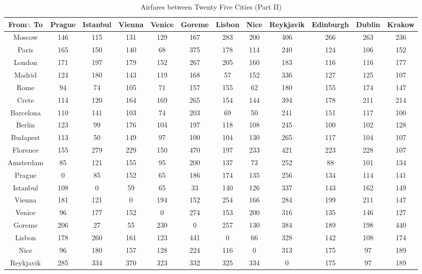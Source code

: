 \documentclass[12pt]{article}
\begin{document}
\begin{landscape}
\begin{table}[h]
\caption{Airfares between Twenty Five Cities (Part II)}
\centering
\vspace{1mm}
\begin{tabular}{c|c|c|c|c|c|c|c|c|c|c|c}
\hline
\rule{0pt}{2ex} From$\backslash$ To & Prague & Istanbul & Vienna & Venice & Goreme & Lisbon & Nice & Reykjavik & Edinburgh & Dublin & Krakow  \\
\hline
\rule{0pt}{2ex}Moscow & 146 & 115 & 131 & 129 & 167 & 283 & 200 & 406 & 266 & 263 & 236 \\
Paris & 165 & 150 & 140 & 68 & 375 & 178 & 114 & 240 & 124 & 106 & 152 \\
London & 171 & 197 & 179 & 152 & 267 & 205 & 160 & 183 & 116 & 116 & 177 \\
Madrid & 124 & 180 & 143 & 119 & 168 & 57 & 152 & 336 & 127 & 125 & 107 \\
Rome & 94 & 74 & 105 & 71 & 157 & 155 & 62 & 180 & 155 & 174 & 147 \\
Crete & 114 & 120 & 164 & 169 & 265 & 154 & 144 & 394 & 178 & 211 & 214 \\
Barcelona & 110 & 141 & 103 & 74 & 203 & 69 & 50 & 241 & 151 & 117 & 100 \\
Berlin & 123 & 99 & 176 & 104 & 197 & 118 & 108 & 245 & 100 & 102 & 128 \\
Budapest & 113 & 50 & 149 & 97 & 100 & 104 & 130 & 265 & 117 & 104 & 107 \\
Florence & 155 & 279 & 229 & 150 & 470 & 197 & 233 & 421 & 223 & 228 & 107 \\
Amsterdam & 85 & 121 & 155 & 95 & 200 & 137 & 73 & 252 & 88 & 101 & 134 \\
Prague & 0 & 85 & 152 & 65 & 186 & 174 & 135 & 256 & 134 & 114 & 141 \\
Istanbul & 108 & 0 & 59 & 65 & 33 & 140 & 126 & 337 & 143 & 162 & 149 \\
Vienna & 181 & 121 & 0 & 194 & 152 & 254 & 166 & 284 & 199 & 211 & 147 \\
Venice & 96 & 177 & 152 & 0 & 274 & 153 & 200 & 316 & 135 & 146 & 127 \\
Goreme & 206 & 27 & 55 & 230 & 0 & 257 & 130 & 384 & 189 & 198 & 440 \\
Lisbon & 178 & 260 & 161 & 123 & 441 & 0 & 66 & 328 & 142 & 108 & 174 \\
Nice & 96 & 180 & 157 & 128 & 224 & 116 & 0 & 313 & 175 & 97 & 189 \\
Reykjavik & 285 & 334 & 370 & 323 & 332 & 325 & 334 & 0 & 175 & 97 & 189 \\

\end{tabular}
\end{table}
\end{landscape}
\end{document}
